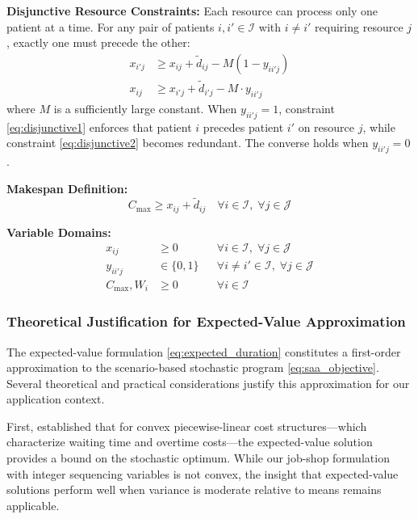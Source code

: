 \documentclass[msom,blindrev]{informs3}
\begin{document}
\textbf{Disjunctive Resource Constraints:} Each resource can process only one patient at a time. For any pair of patients $i, i' \in \mathcal{I}$ with $i \neq i'$ requiring resource $j$, exactly one must precede the other:
\begin{align}
x_{i'j} &\geq x_{ij} + \tilde{d}_{ij} - M(1 - y_{ii'j}) \label{eq:disjunctive1} \\
x_{ij} &\geq x_{i'j} + \tilde{d}_{i'j} - M \cdot y_{ii'j} \label{eq:disjunctive2}
\end{align}
where $M$ is a sufficiently large constant. When $y_{ii'j} = 1$, constraint \eqref{eq:disjunctive1} enforces that patient $i$ precedes patient $i'$ on resource $j$, while constraint \eqref{eq:disjunctive2} becomes redundant. The converse holds when $y_{ii'j} = 0$.

\textbf{Makespan Definition:}
\begin{equation}
C_{\max} \geq x_{ij} + \tilde{d}_{ij} \quad \forall i \in \mathcal{I}, \; \forall j \in \mathcal{J}
\label{eq:makespan}
\end{equation}

\textbf{Variable Domains:}
\begin{align}
x_{ij} &\geq 0 && \forall i \in \mathcal{I}, \; \forall j \in \mathcal{J} \\
y_{ii'j} &\in \{0, 1\} && \forall i \neq i' \in \mathcal{I}, \; \forall j \in \mathcal{J} \\
C_{\max}, W_i &\geq 0 && \forall i \in \mathcal{I}
\end{align}

\subsubsection{Theoretical Justification for Expected-Value Approximation}

The expected-value formulation \eqref{eq:expected_duration} constitutes a first-order approximation to the scenario-based stochastic program \eqref{eq:saa_objective}. Several theoretical and practical considerations justify this approximation for our application context.

First, \citet{denton2003sequential} established that for convex piecewise-linear cost structures---which characterize waiting time and overtime costs---the expected-value solution provides a bound on the stochastic optimum. While our job-shop formulation with integer sequencing variables is not convex, the insight that expected-value solutions perform well when variance is moderate relative to means remains applicable.
\end{document}

